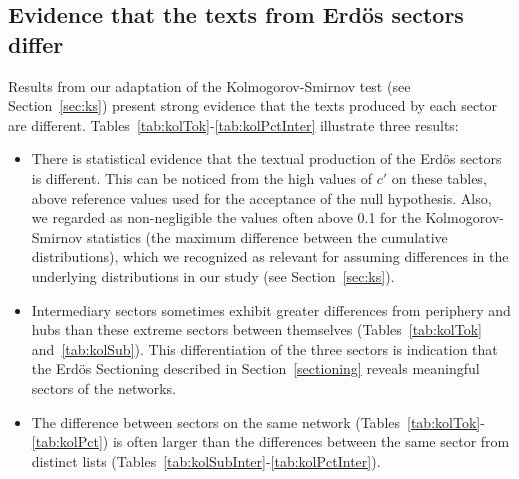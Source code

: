 																																							\subsection{Evidence that the texts from Erd\"os sectors differ}\label{subsec:di}
																																							Results from our adaptation of the Kolmogorov-Smirnov test (see Section~\ref{sec:ks})
																																							present strong evidence
																																							that the texts produced by each sector are different.
																																							Tables~\ref{tab:kolTok}-\ref{tab:kolPctInter}
																																							illustrate three results:
																																							\begin{itemize}
																																							    \item There is statistical evidence that the textual production of the Erd\"os sectors is different.
																																							    	    This can be noticed from the high values of $c'$ on these tables, above reference values used for the acceptance of the null hypothesis. Also, we regarded as non-negligible the values often above 0.1 for the Kolmogorov-Smirnov statistics (the maximum difference between the cumulative distributions), which we recognized as relevant for assuming differences in the underlying distributions in our study (see Section~\ref{sec:ks}).
																																								        \item Intermediary sectors sometimes exhibit greater differences 
																																									from periphery and hubs than these extreme sectors between themselves 
																																									(Tables~\ref{tab:kolTok} and~\ref{tab:kolSub}).
																																									This differentiation of the three sectors is indication that the Erd\"os Sectioning described in Section~\ref{sectioning} reveals meaningful sectors of the networks.
																																									    \item The difference between sectors on the same network  (Tables~\ref{tab:kolTok}-\ref{tab:kolPct}) is often larger than the differences between the same sector from distinct lists (Tables~\ref{tab:kolSubInter}-\ref{tab:kolPctInter}).
																																									    \end{itemize}

																																									    
																																									    
																																									    

